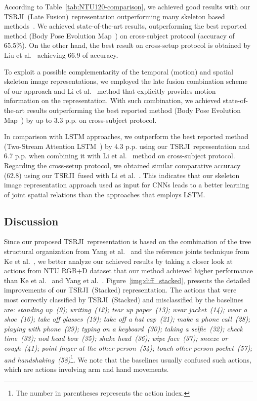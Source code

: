 \documentclass[10pt,conference]{IEEEtran}
\def\sigla{TSRJI}
\begin{document}
According to Table~\ref{tab:NTU120-comparison}, we achieved good results with our \sigla~(Late Fusion)~representation outperforming many skeleton based methods~\cite{Shahroudy:2016, Hu:2018, Hu:2017, Liu:2016, Liu:2018, Liu:2017b, Ke:2017, Liu:2019b, Liu:2017c, Liu:2018b, Ke:2018, Liu:2018c}.  We achieved state-of-the-art results, outperforming the best reported method (Body Pose Evolution Map~\cite{Liu:2018c}) on cross-subject protocol (accuracy of 65.5\%). On the other hand, the best result on cross-setup protocol is obtained by Liu et al.~\cite{Liu:2018c} achieving 66.9 of accuracy.

To exploit a possible complementarity of the temporal (motion) and spatial skeleton image representations, we employed the late fusion combination scheme of our approach and Li et al.~\cite{Li:2018} method that explicitly provides motion information on the representation. With such combination, we achieved state-of-the-art results outperforming the best reported method (Body Pose Evolution Map~\cite{Liu:2018c}) by up to 3.3 p.p. on cross-subject protocol.

In comparison with LSTM approaches, we outperform the best reported method (Two-Stream Attention LSTM~\cite{Liu:2018b}) by 4.3 p.p. using our \sigla~representation and 6.7 p.p. when combining it with Li et al.~\cite{Li:2018} method on cross-subject protocol. Regarding the cross-setup protocol, we obtained similar comparative accuracy (62.8) using our \sigla~fused with Li et al.~\cite{Li:2018}. This indicates that our skeleton image representation approach used as input for CNNs leads to a better learning of joint spatial relations than the approaches that employs LSTM.



\subsection{Discussion}

Since our proposed \sigla~representation is based on the combination of the tree structural organization from Yang et al.~\cite{Yang:2018} and the reference joints technique from Ke et al.~\cite{Ke:2017}, we better analyze our achieved results by taking a closer look at actions from NTU RGB+D dataset that our method achieved higher performance than Ke et al.~\cite{Ke:2017} and Yang et al.~\cite{Yang:2018}. Figure~\ref{img:diff_stacked}, presents the detailed improvements of our \sigla~(Stacked) representation. The actions that were most correctly classified by \sigla~(Stacked) and misclassified by the baselines are: \emph{standing up~(9); writing~(12); tear up paper~(13); wear jacket~(14); wear a shoe~(16); take off glasses~(19); take off a hat cap~(21); make a phone call~(28); playing with phone~(29); typing on a keyboard~(30); taking a selfie~(32); check time~(33); nod head bow~(35); shake head~(36); wipe face~(37); sneeze or cough~(41); point finger at the other person~(54); touch other person pocket~(57); and handshaking~(58)}\footnote{The number in parentheses represents the action index.}. We note that the baselines usually confused such actions, which are actions involving arm and hand movements.
\end{document}
